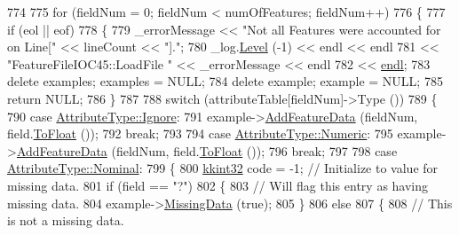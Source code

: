 \begin{DoxyCode}
774 
775     \textcolor{keywordflow}{for}  (fieldNum = 0;  fieldNum < numOfFeatures;  fieldNum++)
776     \{
777       \textcolor{keywordflow}{if}  (eol  ||  eof)
778       \{
779         \_errorMessage << \textcolor{stringliteral}{"Not all Features were accounted for on Line["} << lineCount << \textcolor{stringliteral}{"]."};
780         \_log.\hyperlink{class_k_k_b_1_1_run_log_a32cf761d7f2e747465fd80533fdbb659}{Level} (-1) << endl << endl
781                         << \textcolor{stringliteral}{"FeatureFileIOC45::LoadFile    "} << \_errorMessage << endl
782                         << \hyperlink{namespace_k_k_b_ad1f50f65af6adc8fa9e6f62d007818a8}{endl};
783         \textcolor{keyword}{delete}  examples;  examples = NULL;
784         \textcolor{keyword}{delete}  example;   example  = NULL;
785         \textcolor{keywordflow}{return} NULL;
786       \}
787 
788       \textcolor{keywordflow}{switch}  (attributeTable[fieldNum]->Type ())
789       \{
790       \textcolor{keywordflow}{case} \hyperlink{namespace_k_k_m_l_l_a99973706982b59debba670e2480555abafd038fc7f319e48f3115d92bf5bdbef9}{AttributeType::Ignore}:  
791         example->\hyperlink{class_k_k_m_l_l_1_1_feature_vector_abf364e3348c041cd7be6f14d6c4567cf}{AddFeatureData} (fieldNum, field.\hyperlink{class_k_k_b_1_1_k_k_str_a09b54184fdc585259d265db3deb28e79}{ToFloat} ());
792         \textcolor{keywordflow}{break};
793               
794       \textcolor{keywordflow}{case} \hyperlink{namespace_k_k_m_l_l_a99973706982b59debba670e2480555aba87322391cc6e8948ce9fd5d6cb84fced}{AttributeType::Numeric}: 
795         example->\hyperlink{class_k_k_m_l_l_1_1_feature_vector_abf364e3348c041cd7be6f14d6c4567cf}{AddFeatureData} (fieldNum, field.\hyperlink{class_k_k_b_1_1_k_k_str_a09b54184fdc585259d265db3deb28e79}{ToFloat} ());
796         \textcolor{keywordflow}{break};
797 
798       \textcolor{keywordflow}{case} \hyperlink{namespace_k_k_m_l_l_a99973706982b59debba670e2480555aba8c28d7c312116b8a46e2f466cb33d5b4}{AttributeType::Nominal}: 
799       \{
800         \hyperlink{namespace_k_k_b_a8fa4952cc84fda1de4bec1fbdd8d5b1b}{kkint32}  code = -1;  \textcolor{comment}{// Initialize to value for missing data.}
801         \textcolor{keywordflow}{if}  (field == \textcolor{stringliteral}{"?"})
802         \{
803           \textcolor{comment}{// Will flag this entry as having missing data.}
804           example->\hyperlink{class_k_k_m_l_l_1_1_feature_vector_a6576552806c4833d80013d8e759f76bf}{MissingData} (\textcolor{keyword}{true});
805         \}
806         \textcolor{keywordflow}{else}
807         \{
808           \textcolor{comment}{// This is not a missing data.}

\end{DoxyCode}
